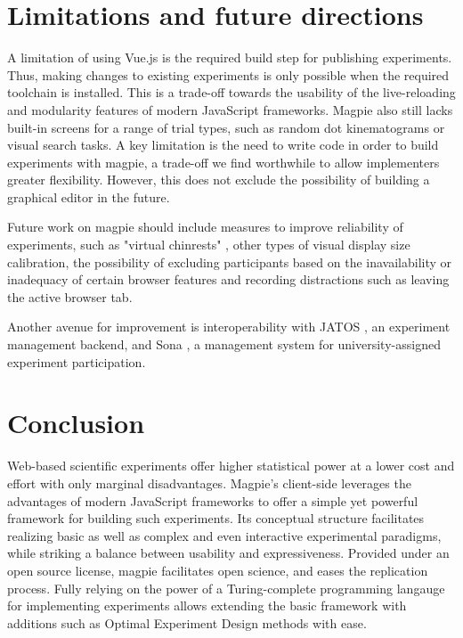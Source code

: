 \documentclass[a4paper,11pt]{scrreprt}
\begin{document}
\chapter{Limitations and future directions}
A limitation of using Vue.js is the required build step for publishing experiments. Thus, making changes to existing experiments is only possible when the required toolchain is installed. This is a trade-off towards the usability of the live-reloading and modularity features of modern JavaScript frameworks. Magpie also still lacks built-in screens for a range of trial types, such as random dot kinematograms or visual search tasks. A key limitation is the need to write code in order to build experiments with magpie, a trade-off we find worthwhile to allow implementers greater flexibility. However, this does not exclude the possibility of building a graphical editor in the future.

Future work on magpie should include measures to improve reliability of experiments, such as "virtual chinrests" \citep{Li2020}, other types of visual display size calibration, the possibility of excluding participants based on the inavailability or inadequacy of certain browser features and recording distractions such as leaving the active browser tab.

Another avenue for improvement is interoperability with JATOS \citep{Lange2015}, an experiment management backend, and Sona \citep{SonaSystems2002}, a management system for university-assigned experiment participation.

\chapter{Conclusion}
Web-based scientific experiments offer higher statistical power at a lower cost and effort with only marginal disadvantages. Magpie's client-side leverages the advantages of modern JavaScript frameworks to offer a simple yet powerful framework for building such experiments. Its conceptual structure facilitates realizing basic as well as complex and even interactive experimental paradigms, while striking a balance between usability and expressiveness. Provided under an open source license, magpie facilitates open science, and eases the replication process. Fully relying on the power of a Turing-complete programming langauge for implementing experiments allows extending the basic framework with additions such as Optimal Experiment Design methods with ease.

\newpage 
 

\end{document}
